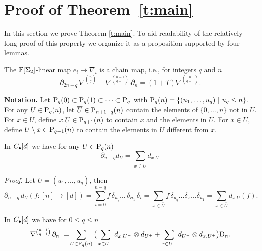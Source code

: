 
\section{Proof of Theorem~\ref{t:main}} \label{s:proof}

In this section we prove Theorem \ref{t:main}.
To aid readability of the relatively long proof of this property we organize it as a proposition supported by four lemmas.
	
\begin{proposition} \label{proposition: chain map}
	The $\F[\Sigma_2]$-linear map $e_i \mapsto \nabla_i$ is a chain map, i.e., for integers $q$ and $n$
	\begin{equation} \label{proposition2: existence: eq1}
	\partial_{2n-q}\,\nabla^{n \choose q} + \nabla^{n-1 \choose q-1}\,\partial_n = (1+T)\nabla^{n \choose q+1}.
	\end{equation}
\end{proposition}

\textbf{Notation.} Let $\P_q(0) \subset \P_q(1) \subset \cdots \subset \P_q $ with \mbox{$\P_q(n) = \{(u_1, \dots, u_q)\ |\ u_q \leq n\}$}. For any $U \in \P_q(n)$, let $\overline{U} \in \P_{n+1-q}(n)$ contain the elements of $\{0, \dots, n\}$ not in $U$. For $x \in \overline{U}$, define $x.U \in \P_{q+1}(n)$ to contain $x$ and the elements in $U$. For $x \in U$, define $U \setminus x \in \P_{q-1}(n)$ to contain the elements in $U$ different from $x$. 

\begin{lemma} \label{lemma1: existence}
	In $\chains[d]$ we have for any $U \in \P_{q}(n)$
	\begin{equation} \label{lemma1: existence: eq1}
	\partial_{n-q} d_U = \sum_{x \in \overline{U}} d_{x.U.}
	\end{equation}
\end{lemma}

\textit{Proof.}
Let $U = (u_1, \dots, u_q)$, then
\begin{equation*}
\partial_{n-q}\, d_U (f : [n] \to [d]) = 
\sum_{i=0}^{n-q} f\, \delta_{u_q} \dots \,\delta_{u_1}\, \delta_i = 
\sum_{x \in \overline{U}} f\, \delta_{u_q} \dots \delta_x \dots \delta_{u_1} = 
\sum_{x \in \overline{U}} d_{x.U} (f).
\end{equation*}

\begin{lemma} \label{lemma2: existence}
	In $\chains[d]$ we have for $0 \leq q \leq n$
	\begin{equation} \label{lemma2: existence: eq1}
	\nabla^{ n-1 \choose q-1}\, \partial_n\ =\! \sum_{U \in \P_q(n)} \big( 
	\sum_{x \in U^+} d_{x.U^-} \tensor d_{U^+} + 
	\sum_{x \in U^-} d_{U^-} \tensor d_{x.U^+} \big) \D_n.
	\end{equation}
\end{lemma}

